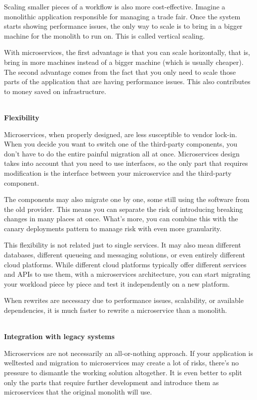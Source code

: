 Scaling smaller pieces of a workflow is also more cost-effective. Imagine a monolithic application responsible for managing a trade fair. Once the system starts showing performance issues, the only way to scale is to bring in a bigger machine for the monolith to run on. This is called vertical scaling.

With microservices, the first advantage is that you can scale horizontally, that is, bring in more machines instead of a bigger machine (which is usually cheaper). The second advantage comes from the fact that you only need to scale those parts of the application that are having performance issues. This also contributes to money saved on infrastructure.

\hspace*{\fill} \\ %
\noindent
\textbf{Flexibility}

Microservices, when properly designed, are less susceptible to vendor lock-in. When you decide you want to switch one of the third-party components, you don't have to do the entire painful migration all at once. Microservices design takes into account that you need to use interfaces, so the only part that requires modification is the interface between your microservice and the third-party component.

The components may also migrate one by one, some still using the software from the old provider. This means you can separate the risk of introducing breaking changes in many places at once. What's more, you can combine this with the canary deployments pattern to manage risk with even more granularity.

This flexibility is not related just to single services. It may also mean different databases, different queueing and messaging solutions, or even entirely different cloud platforms. While different cloud platforms typically offer different services and APIs to use them, with a microservices architecture, you can start migrating your  workload piece by piece and test it independently on a new platform.

When rewrites are necessary due to performance issues, scalability, or available dependencies, it is much faster to rewrite a microservice than a monolith.

\hspace*{\fill} \\ %
\noindent
\textbf{Integration with legacy systems}

Microservices are not necessarily an all-or-nothing approach. If your application is welltested and migration to microservices may create a lot of risks, there's no pressure to dismantle the working solution altogether. It is even better to split only the parts that require further development and introduce them as microservices that the original monolith will use.

